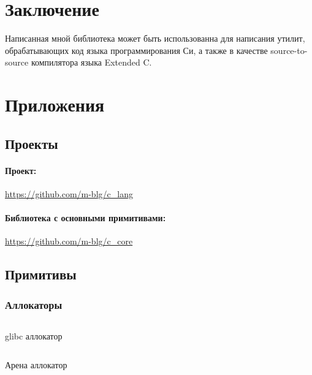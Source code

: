 







\newpage
\section{Заключение}

Написанная мной библиотека может быть использованна для написания утилит, обрабатывающих код языка программирования Си, 
а также в качестве source-to-source компилятора языка Extended C.


\newpage
\section{Приложения}

\subsection{Проекты}
\paragraph{Проект:} \label{extras:ecc} 
\url{https://github.com/m-blg/c_lang}

\paragraph{Библиотека с основными примитивами:} \label{extras:c-core}
\url{https://github.com/m-blg/c_core}


\subsection{Примитивы}
\subsubsection{Аллокаторы}
\begin{code}
  \inputminted[breaklines=true, xleftmargin=1em, linenos, frame=single,
  framesep=10pt, fontsize=\footnotesize]
  {c}{listings/intro/c_alloc.c}
  \caption{glibc аллокатор}
  \label{extras:glibc_alloc}
\end{code}
\begin{code}
  \inputminted[breaklines=true, xleftmargin=1em, linenos, frame=single,
  framesep=10pt, fontsize=\footnotesize]
  {c}{listings/intro/arena.c}
  \caption{Арена аллокатор}
  \label{extras:arena_alloc}
\end{code}

